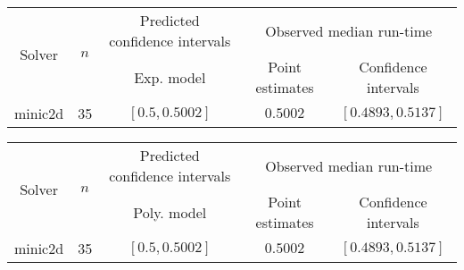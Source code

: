 \begin{tabular}{ccccc}
\hline 
\multirow{2}{*}{Solver} & \multirow{2}{*}{$n$} & Predicted confidence intervals & \multicolumn{2}{c}{Observed median  run-time}\tabularnewline
 &  & Exp. model  & Point estimates  & Confidence intervals\tabularnewline
\hline 
\hline 
\multirow{0}{*}{minic2d} & 35 & $\mathbf{\left[0.5,0.5002\right]}$ & $0.5002$ & $\left[0.4893,0.5137\right]$ \tabularnewline 
\hline 
\end{tabular} 

\begin{tabular}{ccccc}
\hline 
\multirow{2}{*}{Solver} & \multirow{2}{*}{$n$} & Predicted confidence intervals & \multicolumn{2}{c}{Observed median  run-time}\tabularnewline
 &  & Poly. model  & Point estimates  & Confidence intervals\tabularnewline
\hline 
\hline 
\multirow{0}{*}{minic2d} & 35 & $\mathbf{\left[0.5,0.5002\right]}$ & $0.5002$ & $\left[0.4893,0.5137\right]$ \tabularnewline 
\hline 
\end{tabular} 


